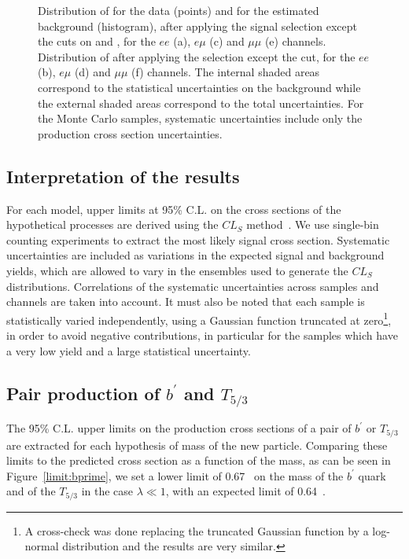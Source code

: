 \begin{figure}[t]
\caption{Distribution of \met{} for the data (points) and for the estimated background (histogram),
after applying the signal selection except the cuts on \met{} and \HT{}, for the $ee$ (a), $e\mu$ (c)
and $\mu\mu$ (e) channels. Distribution of \HT{} after applying the selection except the \HT{} cut,
for the $ee$ (b), $e\mu$ (d) and $\mu\mu$ (f) channels. The internal shaded areas correspond to the
statistical uncertainties on the background while the external shaded areas correspond to the total
uncertainties. For the Monte Carlo samples, systematic uncertainties include only the production 
cross section uncertainties.}\label{fig:signal}
\end{figure}

\subsection{Interpretation of the results}\label{sect:interpretation}
For each model, upper limits at 95\% C.L. on the cross sections of the hypothetical
processes are derived using the $CL_S$ method~\cite{Junk:1999kv,0954-3899-28-10-313}. We use
single-bin counting experiments to extract the most likely signal cross section.
Systematic uncertainties are included as variations in the expected signal and background
yields, which are allowed to vary in the ensembles used to generate the $CL_S$ distributions.
Correlations of the systematic uncertainties across samples and channels are taken into account. 
It must also be noted that each sample is statistically varied independently, using a Gaussian function
truncated at zero\footnote{A cross-check was done replacing the truncated Gaussian function by a 
log-normal distribution and the results are very similar.}, in order to avoid negative contributions, 
in particular for the samples which have a very low yield and a large statistical uncertainty.

\subsection{Pair production of $b^\prime$ and $T_{5/3}$}
The 95\% C.L. upper limits on the production cross sections of a pair of $b^\prime$ or $T_{5/3}$ 
are extracted
for each hypothesis of mass of the new particle. Comparing these limits to the predicted cross section
as a function of the mass, as can be seen in Figure~\ref{limit:bprime}, we set a lower limit of 
0.67~\TeV{} on the mass of the $b^\prime$ quark and of the $T_{5/3}$ in the case $\lambda\ll1$, with an
expected limit of 0.64~\TeV{}.

